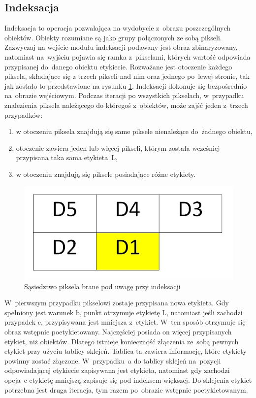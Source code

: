 \subsection{Indeksacja}
\label{subsec:Indeksacja}
Indeksacja to operacja pozwalająca na wydobycie z~obrazu poszczególnych obiektów. Obiekty rozumiane są jako grupy połączonych ze sobą pikseli. Zazwyczaj na wejście modułu indeksacji podawany jest obraz zbinaryzowany, natomiast na~wyjściu pojawia się ramka z~pikselami, których wartość odpowiada przypisanej do~danego obiektu etykiecie. Rozważane jest otoczenie każdego piksela, składające się z trzech pikseli nad nim oraz jednego po~lewej stronie, tak jak zostało to przedstawione na rysunku \ref{fig:ind_sasiedztwo}. Indeksacji dokonuje się bezpośrednio na~obrazie wejściowym. Podczas iteracji po wszystkich pikselach, w~przypadku znalezienia piksela należącego do któregoś z~obiektów, może zajść jeden z~trzech przypadków:
\begin{enumerate}[label=(\alph*)]
	\item w otoczeniu piksela znajdują się same piksele nienależące do~żadnego obiektu,
	\item otoczenie zawiera jeden lub więcej pikseli, którym została wcześniej przypisana taka sama etykieta~L,
	\item w otoczeniu znajdują się piksele posiadające różne etykiety.
\end{enumerate} 
\begin{figure}[h]
	\centering
	\includegraphics[width=\textwidth]{ind_sasiedztwo.jpg}
	\caption{Sąsiedztwo piksela brane pod uwagę przy indeksacji}
	\label{fig:ind_sasiedztwo}
\end{figure}
W~pierwszym przypadku pikselowi zostaje przypisana nowa etykieta. Gdy spełniony jest warunek b, punkt otrzymuje etykietę L, natomiast jeśli zachodzi przypadek c, przypisywana jest mniejsza z~etykiet. W~ten sposób otrzymuje się obraz wstępnie poetykietowany. Najczęściej posiada on więcej przypisanych etykiet, niż obiektów. Dlatego istnieje konieczność złączenia ze~sobą pewnych etykiet przy użyciu tablicy sklejeń. Tablica ta zawiera informację, które etykiety powinny zostać złączone. W~przypadku~a do tablicy sklejeń na~pozycji odpowiadającej etykiecie zapisywana jest etykieta, natomiast gdy zachodzi opcja~c etykietę mniejszą zapisuje się pod indeksem większej. Do sklejenia etykiet potrzebna jest druga iteracja, tym razem po~obrazie wstępnie poetykietowanym.\\
